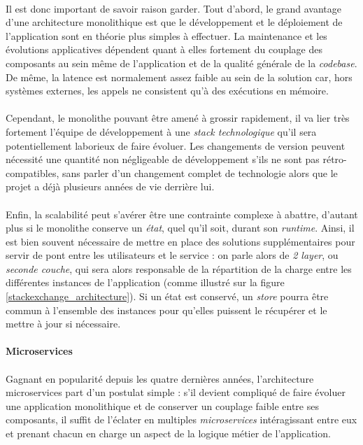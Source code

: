 \paragraph{} Il est donc important de savoir raison garder. Tout d'abord, le grand avantage d'une architecture monolithique
est que le développement et le déploiement de l'application sont en théorie plus simples à effectuer. La maintenance et 
les évolutions applicatives dépendent quant à elles fortement du couplage des composants au sein même de l'application et 
de la qualité générale de la \emph{codebase}. De même, la latence est normalement assez faible au sein de la solution car,
hors systèmes externes, les appels ne consistent qu'à des exécutions en mémoire.

\paragraph{} Cependant, le monolithe pouvant être amené à grossir rapidement, il va lier très fortement l'équipe de développement
à une \emph{stack technologique} qu'il sera potentiellement laborieux de faire évoluer. Les changements de version peuvent 
nécessité une quantité non négligeable de développement s'ils ne sont pas rétro-compatibles, sans parler d'un changement 
complet de technologie alors que le projet a déjà plusieurs années de vie derrière lui.

\paragraph{} Enfin, la scalabilité peut s'avérer être une contrainte complexe à abattre, d'autant plus si le monolithe
conserve un \emph{état}, quel qu'il soit, durant son \emph{runtime}. Ainsi, il est bien souvent nécessaire de mettre en place
des solutions supplémentaires pour servir de pont entre les utilisateurs et le service : on parle alors de \emph{2 layer},
ou \emph{seconde couche}, qui sera alors responsable de la répartition de la charge entre les différentes instances de l'application
(comme illustré sur la figure \ref{stackexchange_architecture}). Si un état est conservé, un \emph{store} pourra être commun
à l'ensemble des instances pour qu'elles puissent le récupérer et le mettre à jour si nécessaire.


\paragraph{Microservices}

\paragraph{} Gagnant en popularité depuis les quatre dernières années, l'architecture microservices part d'un postulat
simple : s'il devient compliqué de faire évoluer une application monolithique et de conserver un couplage faible entre ses
composants, il suffit de l'éclater en multiples \emph{microservices} intéragissant entre eux et prenant chacun en charge 
un aspect de la logique métier de l'application.

